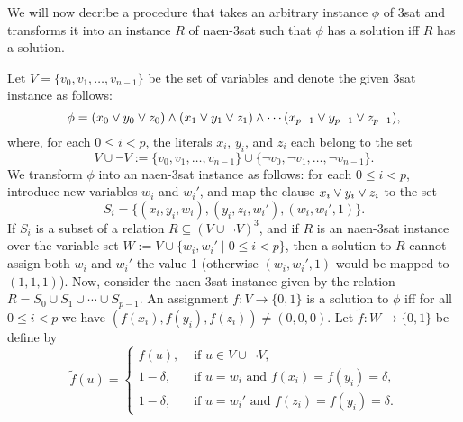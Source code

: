 \documentclass[12pt]{amsart}
\numberwithin{equation}{section}
\theoremstyle{plain}
\theoremstyle{definition}
\newcommand{\sat}{\acs{sat}\xspace}
\newcommand{\nae}{\acs{nae}\xspace}
\newcommand{\naen}{\acs{naen}\xspace}
\newcommand{\NP}{\acs{NP}\xspace}
\begin{document}
We will now decribe a procedure that takes an arbitrary instance $\phi$ 
of 3\sat and transforms it into an instance $R$ of \naen-3\sat such that
$\phi$ has a solution iff $R$ has a solution.

Let $V = \{v_0, v_1, \dots, v_{n-1}\}$ be the set of variables and denote the
given 3\sat instance as follows:
\[
\phi = (x_0 \vee y_0 \vee z_0) \wedge (x_1 \vee y_1 \vee z_1) \wedge 
\cdots (x_{p-1} \vee y_{p-1} \vee z_{p-1}),
\]
where, for each $0\leq i< p$, the literals $x_i$, $y_i$, and $z_i$ each belong
to the set 
\[
V \cup \neg V := 
\{v_0, v_1, \dots, v_{n-1}\} \cup
\{\neg v_0, \neg v_1, \dots, \neg v_{n-1}\}.
\]
We transform $\phi$ into an \naen-3\sat instance as follows:
for each $0\leq i< p$, introduce new variables $w_i$ and $w_i'$, and map the
clause
$x_i \vee y_i \vee z_i$ to the set
\[
S_i = \{ (x_i, y_i, w_i), (y_i, z_i, w_i'), (w_i, w_i', 1)\}.
\]
If $S_i$ is a subset of a relation $R \subseteq (V \cup \neg V)^3$, 
and if $R$ is an \naen-3\sat instance over the variable set
$W:= V\cup \{w_i, w_i'\mid 0\leq i<p\}$, then a solution to $R$ 
cannot assign both $w_i$ and $w_i'$ the value 1 
(otherwise $(w_i, w_i', 1)$ would be mapped to $(1,1,1)$). 
Now, consider the \naen-3\sat instance given by the relation
$R = S_0 \cup S_1 \cup \cdots \cup S_{p-1}$.
An assignment $f : V \to \{0,1\}$ is a solution to $\phi$ iff for all
$0\leq i < p$ we have $(f(x_i), f(y_i), f(z_i)) \neq (0,0,0)$.
Let $\tilde{f}: W \to \{0,1\}$ be define by
\[
\tilde{f}(u) = 
  \begin{cases}
    f(u), & \text{ if $u \in V\cup \neg V$,}\\
    1-\delta, & \text{ if $u =w_i$ and $f(x_i) = f(y_i) = \delta$,}\\
    1-\delta, & \text{ if $u =w_i'$ and $f(z_i) = f(y_i) = \delta$.}
  \end{cases}
\]

\end{document}
